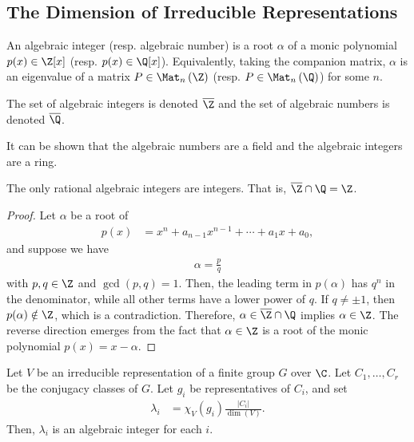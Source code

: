 \documentclass[10pt]{mypackage}
\begin{document}
\subsection{The Dimension of Irreducible Representations}%
\begin{definition}
  An algebraic integer (resp. algebraic number) is a root $\alpha$ of a monic polynomial $p(x)\in \Z[x]$ (resp. $p(x)\in \Q[x]$). Equivalently, taking the companion matrix, $\alpha$ is an eigenvalue of a matrix $P\in \Mat_n\left( \Z \right)$ (resp. $P\in \Mat_n\left( \Q \right)$) for some $n$.

  The set of algebraic integers is denoted $ \overline{\Z} $ and the set of algebraic numbers is denoted $ \overline{\Q} $.
\end{definition}
It can be shown that the algebraic numbers are a field and the algebraic integers are a ring.
\begin{proposition}
  The only rational algebraic integers are integers. That is, $ \overline{\Z}\cap \Q = \Z $.
\end{proposition}
\begin{proof}
  Let $\alpha$ be a root of
  \begin{align*}
    p(x) &= x^{n} + a_{n-1}x^{n-1} + \cdots + a_1 x + a_0,
  \end{align*}
  and suppose we have
  \begin{align*}
    \alpha = \frac{p}{q}
  \end{align*}
  with $p,q\in \Z$ and $\gcd\left( p,q \right) = 1$. Then, the leading term in $p(\alpha)$ has $q^{n}$ in the denominator, while all other terms have a lower power of $q$. If $q\neq \pm 1$, then $p(\alpha)\notin \Z$, which is a contradiction. Therefore, $\alpha\in \overline{\Z}\cap \Q$ implies $\alpha\in \Z$. The reverse direction emerges from the fact that $\alpha\in \Z$ is a root of the monic polynomial $p(x) = x-\alpha$.
\end{proof}
\begin{proposition}
  Let $V$ be an irreducible representation of a finite group $G$ over $\C$. Let $C_1,\dots,C_r$ be the conjugacy classes of $G$. Let $g_{i}$ be representatives of $C_i$, and set
  \begin{align*}
    \lambda_i &= \chi_V\left( g_i \right)\frac{\left\vert C_i \right\vert}{\dim\left( V \right)}.
  \end{align*}
  Then, $\lambda_i$ is an algebraic integer for each $i$.
\end{proposition}
\end{document}

